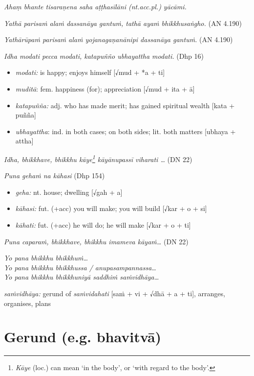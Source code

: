 \documentclass[11pt,oneside]{memoir}
\begin{document}
\emph{Ahaṃ bhante tisaraṇena saha aṭṭhasīlāni (nt.acc.pl.) yācāmi.}

\emph{Yathā parisaṁ alaṁ dassanāya gantuṁ, tathā ayaṁ bhikkhusaṅgho.} (AN 4.190)

\emph{Yathārūpaṁ parisaṁ alaṁ yojanagaṇanānipi dassanāya gantuṁ.} (AN 4.190)

\emph{Idha modati pecca modati, katapuñño ubhayattha modati.} (Dhp 16)

\begin{itemize}
\item \emph{modati:} is happy; enjoys himself [√mud + *a + ti]
\item \emph{muditā}: fem. happiness (for); appreciation [√mud + ita + ā]
\item \emph{katapuñña:} adj. who has made merit; has gained spiritual wealth [kata + puñña]
\item \emph{ubhayattha}: ind. in both cases; on both sides; lit. both matters [ubhaya + attha]
\end{itemize}

\emph{Idha, bhikkhave, bhikkhu kāye\footnote{\emph{Kāye} (loc.) can mean `in the body', or `with regard to the body'.} kāyānupassī viharati \ldots{}} (DN 22)

\emph{Puna gehaṁ na kāhasi} (Dhp 154)

\begin{itemize}
\item \emph{geha:} nt. house; dwelling [√gah + a]
\item \emph{kāhasi:} fut. (+acc) you will make; you will build [√kar + o + si]
\item \emph{kāhati:} fut. (+acc) he will do; he will make [√kar + o + ti]
\end{itemize}

\emph{Puna caparaṁ, bhikkhave, bhikkhu imameva kāyaṁ\ldots{}} (DN 22)

\emph{Yo pana bhikkhu bhikkhuṁ\ldots{}} \\[0pt]
\emph{Yo pana bhikkhu bhikkhussa / anupasampannassa\ldots{}} \\[0pt]
\emph{Yo pana bhikkhu bhikkhuniyā saddhiṁ saṁvidhāya\ldots{}}

\emph{saṁvidhāya:} gerund of \emph{saṁvidahati} [saṁ + vi + √dhā + a + ti], arranges, organises, plans

\clearpage

\section{Gerund (e.g. bhavitvā)}
\label{sec:org4a6be62}
\end{document}

